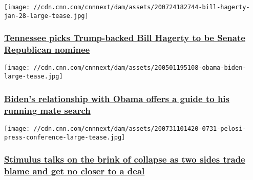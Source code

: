 \href{/2020/08/06/politics/tennessee-republican-senate-primary-trump/index.html}{}

\texttt{[image: //cdn.cnn.com/cnnnext/dam/assets/200724182744-bill-hagerty-jan-28-large-tease.jpg]}

\hypertarget{tennessee-picks-trump-backed-bill-hagerty-to-be-senate-republican-nominee}{%
\subsubsection{\texorpdfstring{\href{/2020/08/06/politics/tennessee-republican-senate-primary-trump/index.html}{Tennessee
picks Trump-backed Bill Hagerty to be Senate Republican
nominee}}{Tennessee picks Trump-backed Bill Hagerty to be Senate Republican nominee}}\label{tennessee-picks-trump-backed-bill-hagerty-to-be-senate-republican-nominee}}

\href{/2020/08/07/politics/biden-running-mate/index.html}{}

\texttt{[image: //cdn.cnn.com/cnnnext/dam/assets/200501195108-obama-biden-large-tease.jpg]}

\hypertarget{bidens-relationship-with-obama-offers-a-guide-to-his-running-mate-search}{%
\subsubsection{\texorpdfstring{\href{/2020/08/07/politics/biden-running-mate/index.html}{Biden's
relationship with Obama offers a guide to his running mate
search}}{Biden's relationship with Obama offers a guide to his running mate search}}\label{bidens-relationship-with-obama-offers-a-guide-to-his-running-mate-search}}

\href{/2020/08/06/politics/stimulus-talks-latest-nancy-pelosi-jobless-benefits/index.html}{}

\texttt{[image: //cdn.cnn.com/cnnnext/dam/assets/200731101420-0731-pelosi-press-conference-large-tease.jpg]}

\hypertarget{stimulus-talks-on-the-brink-of-collapse-as-two-sides-trade-blame-and-get-no-closer-to-a-deal}{%
\subsubsection{\texorpdfstring{\href{/2020/08/06/politics/stimulus-talks-latest-nancy-pelosi-jobless-benefits/index.html}{Stimulus
talks on the brink of collapse as two sides trade blame and get no
closer to a
deal}}{Stimulus talks on the brink of collapse as two sides trade blame and get no closer to a deal}}\label{stimulus-talks-on-the-brink-of-collapse-as-two-sides-trade-blame-and-get-no-closer-to-a-deal}}

